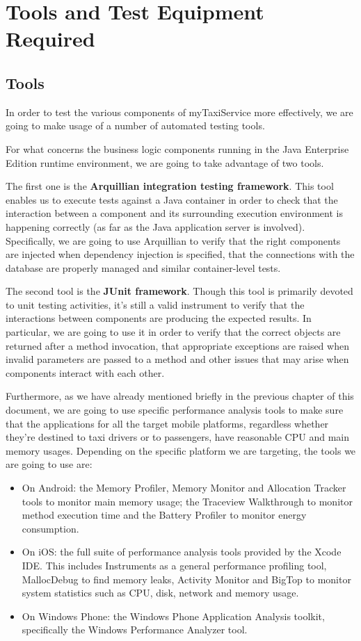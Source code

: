 \chapter{Tools and Test Equipment Required}
\section{Tools}
In order to test the various components of myTaxiService more effectively, we are going to make usage of a number of automated testing tools. 

For what concerns the business logic components running in the Java Enterprise Edition runtime environment, we are going to take advantage of two tools.

The first one is the \textbf{Arquillian integration testing framework}. This tool enables us to execute tests against a Java container in order to check that the interaction between a component and its surrounding execution environment is happening correctly (as far as the Java application server is involved). Specifically, we are going to use Arquillian to verify that the right components are injected when dependency injection is specified, that the connections with the database are properly managed and similar container-level tests.

The second tool is the \textbf{JUnit framework}. Though this tool is primarily devoted to unit testing activities, it's still a valid instrument to verify that the interactions between components are producing the expected results. In particular, we are going to use it in order to verify that the correct objects are returned after a method invocation, that appropriate exceptions are raised when invalid parameters are passed to a method and other issues that may arise when components interact with each other.

Furthermore, as we have already mentioned briefly in the previous chapter of this document, we are going to use specific performance analysis tools to make sure that the applications for all the target mobile platforms, regardless whether they're destined to taxi drivers or to passengers, have reasonable CPU and main memory usages. Depending on the specific platform we are targeting, the tools we are going to use are:
\begin{itemize}
	\item On Android: the Memory Profiler, Memory Monitor and Allocation Tracker tools to monitor main memory usage; the Traceview Walkthrough to monitor method execution time and the Battery Profiler to monitor energy consumption.
	\item On iOS: the full suite of performance analysis tools provided by the Xcode IDE. This includes Instruments as a general performance profiling tool, MallocDebug to find memory leaks, Activity Monitor and BigTop to monitor system statistics such as CPU, disk, network and memory usage. 
	\item On Windows Phone: the Windows Phone Application Analysis toolkit, specifically the Windows Performance Analyzer tool.
\end{itemize}

